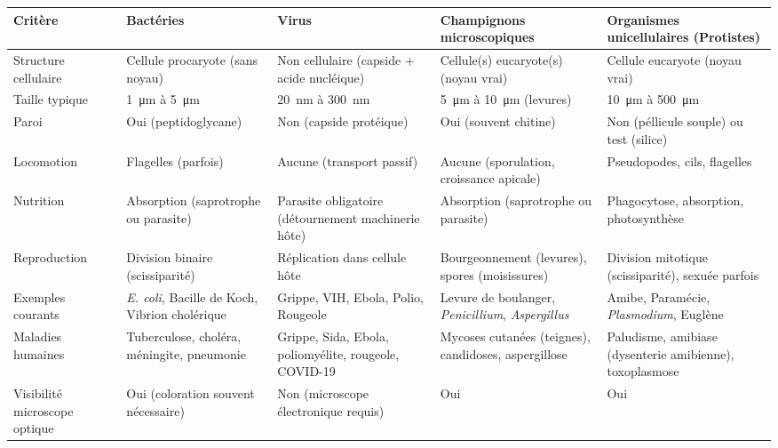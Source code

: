 \documentclass[11pt]{article}
\begin{document}
\begin{center}
\begin{tabularx}{\linewidth}{|l|X|X|X|X|}
\hline
\rowcolor{popblueL} \textbf{Critère} & \textbf{Bactéries} & \textbf{Virus} & \textbf{Champignons microscopiques} & \textbf{Organismes unicellulaires (Protistes)} \\
\hline
Structure cellulaire & Cellule procaryote (sans noyau) & Non cellulaire (capside + acide nucléique) & Cellule(s) eucaryote(s) (noyau vrai) & Cellule eucaryote (noyau vrai) \\
\hline
Taille typique & \SI{1}{\micro\meter} à \SI{5}{\micro\meter} & \SI{20}{\nano\meter} à \SI{300}{\nano\meter} & \SI{5}{\micro\meter} à \SI{10}{\micro\meter} (levures) & \SI{10}{\micro\meter} à \SI{500}{\micro\meter} \\
\hline
Paroi & Oui (peptidoglycane) & Non (capside protéique) & Oui (souvent chitine) & Non (péllicule souple) ou test (silice) \\
\hline
Locomotion & Flagelles (parfois) & Aucune (transport passif) & Aucune (sporulation, croissance apicale) & Pseudopodes, cils, flagelles \\
\hline
Nutrition & Absorption (saprotrophe ou parasite) & Parasite obligatoire (détournement machinerie hôte) & Absorption (saprotrophe ou parasite) & Phagocytose, absorption, photosynthèse \\
\hline
Reproduction & Division binaire (scissiparité) & Réplication dans cellule hôte & Bourgeonnement (levures), spores (moisissures) & Division mitotique (scissiparité), sexuée parfois \\
\hline
Exemples courants & \emph{E. coli}, Bacille de Koch, Vibrion cholérique & Grippe, VIH, Ebola, Polio, Rougeole & Levure de boulanger, \emph{Penicillium}, \emph{Aspergillus} & Amibe, Paramécie, \emph{Plasmodium}, Euglène \\
\hline
Maladies humaines & Tuberculose, choléra, méningite, pneumonie & Grippe, Sida, Ebola, poliomyélite, rougeole, COVID-19 & Mycoses cutanées (teignes), candidoses, aspergillose & Paludisme, amibiase (dysenterie amibienne), toxoplasmose \\
\hline
Visibilité microscope optique & Oui (coloration souvent nécessaire) & Non (microscope électronique requis) & Oui & Oui \\
\hline
\end{tabularx}
\end{center}
\end{document}
